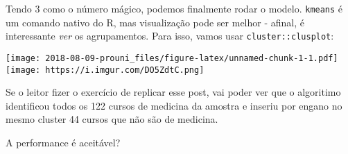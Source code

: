 \documentclass[]{article}
\newenvironment{Shaded}{\begin{snugshade}}{\end{snugshade}}
\newcommand{\KeywordTok}[1]{\textcolor[rgb]{0.13,0.29,0.53}{\textbf{#1}}}
\newcommand{\DataTypeTok}[1]{\textcolor[rgb]{0.13,0.29,0.53}{#1}}
\newcommand{\DecValTok}[1]{\textcolor[rgb]{0.00,0.00,0.81}{#1}}
\newcommand{\StringTok}[1]{\textcolor[rgb]{0.31,0.60,0.02}{#1}}
\newcommand{\OtherTok}[1]{\textcolor[rgb]{0.56,0.35,0.01}{#1}}
\newcommand{\OperatorTok}[1]{\textcolor[rgb]{0.81,0.36,0.00}{\textbf{#1}}}
\newcommand{\NormalTok}[1]{#1}
\begin{document}
Tendo 3 como o número mágico, podemos finalmente rodar o modelo.
\texttt{kmeans} é um comando nativo do R, mas visualização pode ser
melhor - afinal, é interessante \emph{ver} os agrupamentos. Para isso,
vamos usar \texttt{cluster::clusplot}:

\begin{Shaded}
\end{Shaded}

\texttt{[image: 2018-08-09-prouni\_files/figure-latex/unnamed-chunk-1-1.pdf]}
\texttt{[image: https://i.imgur.com/DO5ZdtC.png]}

Se o leitor fizer o exercício de replicar esse post, vai poder ver que o
algoritimo identificou todos os 122 cursos de medicina da amostra e
inseriu por engano no mesmo cluster 44 cursos que não são de medicina.

A performance é aceitável?
\end{document}
